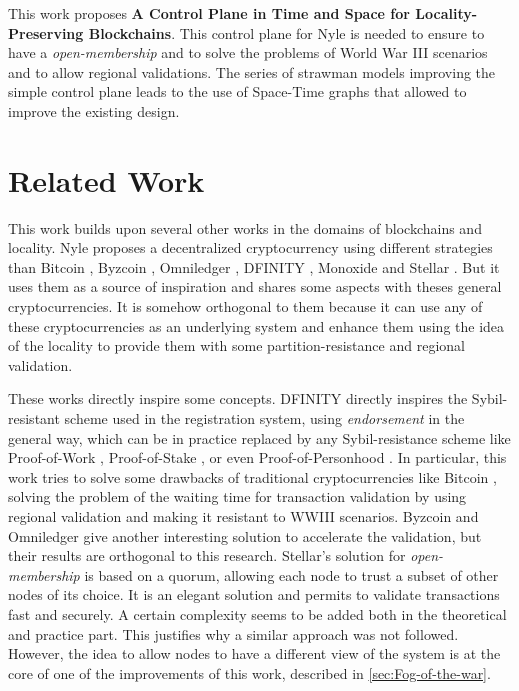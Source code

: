 \documentclass[a4paper,11pt,oneside]{report}
\begin{document}

This work proposes \textbf{A Control Plane in Time and Space for
Locality-Preserving Blockchains}. This control plane for Nyle is needed to
ensure to have a \textit{open-membership} and to solve the problems of World
War III scenarios and to allow regional validations. The series of strawman
models improving the simple control plane leads to the use of Space-Time graphs
that allowed to improve the existing design. 



\chapter{Related Work} \label{chap:RelatedWork} %

This work builds upon several other works in the domains of
blockchains and locality. Nyle proposes a decentralized cryptocurrency using
different strategies than Bitcoin \cite{Nakamoto2009}, Byzcoin
\cite{Kogias2016}, Omniledger \cite{Kokoris-Kogias2017}, DFINITY
\cite{Hanke2018}, Monoxide \cite{Wang2019} and Stellar \cite{Lokhava2019}. But
it uses them as a source of inspiration and shares some aspects with theses
general cryptocurrencies. It is somehow orthogonal to them because it can use
any of these cryptocurrencies as an underlying system and enhance them using
the idea of the locality to provide them with some partition-resistance and
regional validation. 

These works directly inspire some concepts. DFINITY
\cite{ Hanke2018} directly inspires the Sybil-resistant scheme
used in the registration system, using \textit{endorsement} in the general way, which can be
in practice replaced by any Sybil-resistance scheme like Proof-of-Work
\cite{Nakamoto2009}, Proof-of-Stake \cite{wood2014ethereum}, or even
Proof-of-Personhood \cite{Borge2017}. In particular, this work tries to solve
some drawbacks of traditional cryptocurrencies like Bitcoin
\cite{Nakamoto2009}, solving the problem of the waiting time for transaction
validation by using regional validation and making it resistant to WWIII
scenarios. Byzcoin \cite{Kogias2016} and Omniledger \cite{Kokoris-Kogias2017}
give another interesting solution to accelerate the validation, but their
results are orthogonal to this research. Stellar's solution for
\textit{open-membership} \cite{Lokhava2019} is based on a quorum, allowing each
node to trust a subset of other nodes of its choice. It is an elegant solution
and permits to validate transactions fast and securely. A certain complexity
seems to be added both in the theoretical and practice part. This justifies why
a similar approach was not followed. However, the idea to allow nodes to have a
different view of the system is at the core of one of the improvements of this
work, described in \autoref{sec:Fog-of-the-war}.
\end{document}
